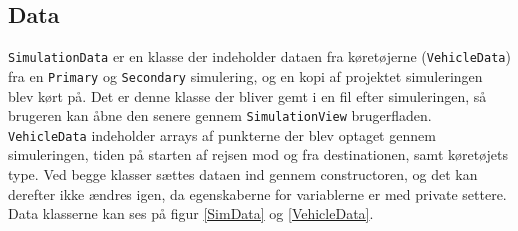 \subsection{Data}
\texttt{SimulationData} er en klasse der indeholder dataen fra køretøjerne (\texttt{VehicleData}) fra en \texttt{Primary} og \texttt{Secondary} simulering, og en kopi af projektet simuleringen blev kørt på. Det er denne klasse der bliver gemt i en fil efter simuleringen, så brugeren kan åbne den senere gennem \texttt{SimulationView} brugerfladen. \texttt{VehicleData} indeholder arrays af punkterne der blev optaget gennem simuleringen, tiden på starten af rejsen mod og fra destinationen, samt køretøjets type. Ved begge klasser sættes dataen ind gennem constructoren, og det kan derefter ikke ændres igen, da egenskaberne for variablerne er med private settere. Data klasserne kan ses på figur \ref{SimData} og \ref{VehicleData}.

